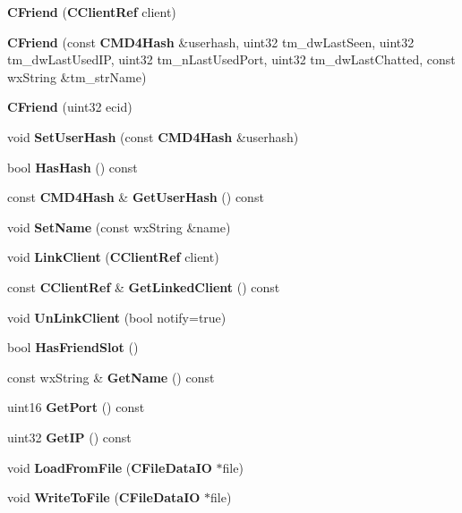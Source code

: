 \begin{DoxyCompactItemize}
\item 
{\bfseries CFriend} ({\bf CClientRef} client)\label{classCFriend_a39831b9fa5c2e30eb3891fe2a9173b5d}

\item 
{\bfseries CFriend} (const {\bf CMD4Hash} \&userhash, uint32 tm\_\-dwLastSeen, uint32 tm\_\-dwLastUsedIP, uint32 tm\_\-nLastUsedPort, uint32 tm\_\-dwLastChatted, const wxString \&tm\_\-strName)\label{classCFriend_a3bd2ed2e1bcc4bc62528f73e3e0bc824}

\item 
{\bfseries CFriend} (uint32 ecid)\label{classCFriend_a4e0b2a93303f3b50f6c24ad121b4b3cc}

\item 
void {\bfseries SetUserHash} (const {\bf CMD4Hash} \&userhash)\label{classCFriend_a040bb882be4e2a5fc45dfc26011c7465}

\item 
bool {\bfseries HasHash} () const \label{classCFriend_a57377762c02e9579081fadfe29056088}

\item 
const {\bf CMD4Hash} \& {\bfseries GetUserHash} () const \label{classCFriend_a83eeaf8e7f34fcd9df43724d7e6d1f04}

\item 
void {\bfseries SetName} (const wxString \&name)\label{classCFriend_a0ac06bae1e1b9b7e6494773ab0daa92a}

\item 
void {\bfseries LinkClient} ({\bf CClientRef} client)\label{classCFriend_a9d4b07b9bc5c5e6002f806753f8778f7}

\item 
const {\bf CClientRef} \& {\bfseries GetLinkedClient} () const \label{classCFriend_afd77bf62a25ca5f44225debcb6b14e7e}

\item 
void {\bfseries UnLinkClient} (bool notify=true)\label{classCFriend_a7cbe8dde4e210c81837697c8fe0ce248}

\item 
bool {\bfseries HasFriendSlot} ()\label{classCFriend_a39a088867dbe6184699158cf04a021c6}

\item 
const wxString \& {\bfseries GetName} () const \label{classCFriend_a031df755abe82fb0c97eed8069cb6235}

\item 
uint16 {\bfseries GetPort} () const \label{classCFriend_a1715c38ff18e020073bc3aa9e2076e4a}

\item 
uint32 {\bfseries GetIP} () const \label{classCFriend_a1c72942563d8736307f50622ea0927d2}

\item 
void {\bfseries LoadFromFile} ({\bf CFileDataIO} $\ast$file)\label{classCFriend_a120df3aba1cb8eba304c5be09f9bccec}

\item 
void {\bfseries WriteToFile} ({\bf CFileDataIO} $\ast$file)\label{classCFriend_aed9e36ebcb387c965741e33ec91a30b3}

\end{DoxyCompactItemize}
